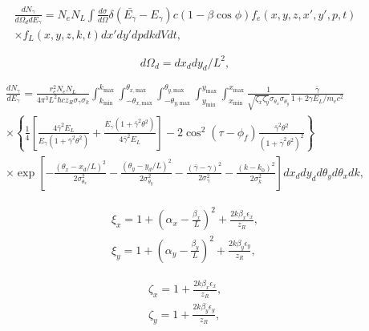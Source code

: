 \documentclass[../main.tex]{subfiles}
\begin{document}
\begin{multline}
\frac{dN_{\gamma}}{d\Omega_{d} dE_{\gamma}} = N_{e}N_{L}\int \frac{d\sigma}{d\Omega}\delta\left(\bar{E_{\gamma}}-E_{\gamma}\right)c\left(1-\beta\cos\phi\right)f_{e}\left(x,y,z,x',y',p,t\right)\\ \times f_L\left(x,y,z,k,t\right)dx' dy' dp dk dV dt,
\label{eq:central_distribution_sun}
\end{multline}

\begin{equation}
d\Omega_{d} = dx_{d}dy_{d}/L^{2},
\label{eq:detector_solid_angle_sun}
\end{equation}

\begin{multline}
\frac{dN_{\gamma}}{dE_{\gamma}} = \frac{r_{e}^{2}N_{e}N_{L}}{4\pi^{3}L^{2}\hbar c z_{R}\sigma_{\gamma}\sigma_{k}}\int_{k_{\mathrm{min}}}^{k_{\mathrm{max}}}\int_{-\theta_{x,\mathrm{max}}}^{\theta_{x,\mathrm{max}}}\int_{-\theta_{y,\mathrm{max}}}^{\theta_{y,\mathrm{max}}}\int_{y_{\mathrm{min}}}^{y_{\mathrm{max}}}\int_{x_{\mathrm{min}}}^{x_{\mathrm{max}}}\frac{1}{\sqrt{\zeta_{x}\zeta_{y}}\sigma_{\theta_{x}}\sigma_{\theta_{y}}}\frac{\bar{\gamma}}{1+2\gamma E_{L}/m_{e}c^{2}} \\
\times\left\{\frac{1}{4}\left[\frac{4\bar{\gamma}^{2}E_{L}}{E_{\gamma}\left(1+\bar{\gamma}^{2}\theta^{2}\right)}+\frac{E_{\gamma}\left(1+\bar{\gamma}^{2}\theta^{2}\right)}{4\bar{\gamma}^{2}E_{L}}\right]-2\cos^{2}\left(\tau-\phi_{f}\right)\frac{\bar{\gamma}^{2}\theta^{2}}{\left(1+\bar{\gamma}^{2}\theta^{2}\right)^{2}}\right\} \\
\times\exp{\left[-\frac{\left(\theta_{x}-x_{d}/L\right)^{2}}{2\sigma_{\theta_{x}}^{2}}-\frac{\left(\theta_{y}-y_{d}/L\right)^{2}}{2\sigma_{\theta_{y}}^{2}}-\frac{\left(\bar{\gamma}-\gamma\right)^{2}}{2\sigma_{\gamma}^{2}}-\frac{\left(k-k_{0}\right)^{2}}{2\sigma_{k}^{2}}\right]}dx_{d}dy_{d}d\theta_{y}d\theta_{x}dk,
\label{eq:ICARUS_equation}
\end{multline}

\begin{gather}
\xi_{x} = 1+\left(\alpha_{x}-\frac{\beta_{x}}{L}\right)^{2}+\frac{2k\beta_{x}\epsilon_{x}}{z_{R}}, \\
\xi_{y} = 1+\left(\alpha_{y}-\frac{\beta_{y}}{L}\right)^{2}+\frac{2k\beta_{y}\epsilon_{y}}{z_{R}},
\label{eq:xi_parameters_sun}
\end{gather}

\begin{gather}
\zeta_{x} = 1+\frac{2k\beta_{x}\epsilon_{x}}{z_{R}}, \\
\zeta_{y} = 1+\frac{2k\beta_{y}\epsilon_{y}}{z_{R}},
\label{eq:zeta_parameters_sun}
\end{gather}
\end{document}
